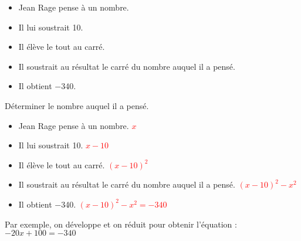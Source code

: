 \begin{exercice*}
    \begin{itemize}
        \item Jean Rage pense à un nombre.
        \item Il lui soustrait \num{10}.
        \item Il élève le tout au carré.
        \item Il soustrait au résultat le carré du nombre auquel il a pensé.
        \item Il obtient \num{-340}.
    \end{itemize}
    Déterminer le nombre auquel il a pensé.
\end{exercice*}
\begin{corrige}
    \begin{itemize}
        \item Jean Rage pense à un nombre. \textcolor{red}{$x$}
        \item Il lui soustrait \num{10}. \textcolor{red}{$x-10$}
        \item Il élève le tout au carré. \textcolor{red}{$(x-10)^2$}
        \item Il soustrait au résultat le carré du nombre auquel il a pensé. \textcolor{red}{$(x-10)^2-x^2$}
        \item Il obtient \num{-340}. \textcolor{red}{$(x-10)^2-x^2=-340$}
    \end{itemize}    

    Par exemple, on développe et on réduit pour obtenir l'équation : $-20x+100=-340$

\end{corrige}
